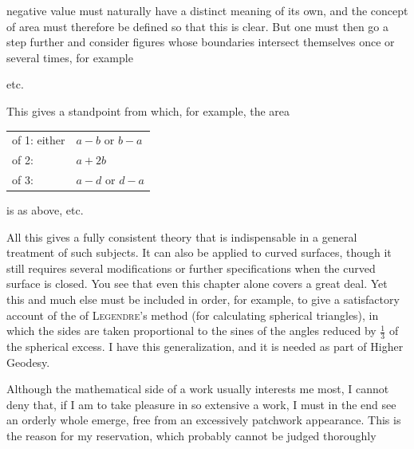 %
negative value must naturally have a distinct meaning of its own, and the concept of area must therefore be defined so that this is clear. But one must then go a step further and consider figures whose boundaries intersect themselves once or several times, for example
\begin{center}
\quad\quad\quad etc.
\end{center}
\noindent This gives a standpoint from which, for example, the area
\begin{center}\begin{tabular}{ll}
of 1: either &$a-b$ or $b-a$\\
of 2: &$a+2b$\\
of 3: &$a-d$ or $d-a$
\end{tabular}\end{center}
\noindent is as above, etc.

All this gives a fully consistent theory that is indispensable in a general treatment of such subjects. It can also be applied to curved surfaces, though it still requires several modifications or further specifications when the curved surface is closed. You see that even this chapter alone covers a great deal. Yet this and much else must be included in order, for example, to give a satisfactory account of the  of \textsc{Legendre}'s method (for calculating spherical triangles), in which the sides are taken proportional to the sines of the angles reduced by $\frac13$ of the spherical excess. I have this generalization, and it is needed as part of Higher Geodesy.

Although the mathematical side of a work usually interests me most, I cannot deny that, if I am to take pleasure in so extensive a work, I must in the end see an orderly whole emerge, free from an excessively patchwork appearance. This is the reason for my reservation, which probably cannot be judged thoroughly
